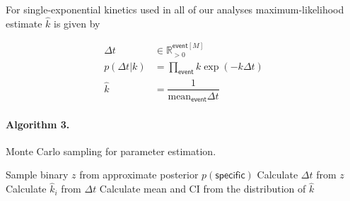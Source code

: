For single-exponential kinetics used in all of our analyses maximum-likelihood estimate $\hat{k}$ is given by

\begin{subequations}
\begin{align}
    \Delta t &\in \mathbb{R}_{>0}^{\mathsf{event}[M]} \\
    p(\Delta t | k) &= \prod_\mathsf{event} k \exp (- k \Delta t) \\
    \hat{k} &= \dfrac{1}{\mathrm{mean}_{\mathsf{event}} \Delta t}
\end{align}
\end{subequations}

\paragraph{Algorithm 3.} Monte Carlo sampling for parameter estimation. \\
\begin{algorithmic}[1]
    \State Sample binary $z$ from approximate posterior $p(\mathsf{specific})$
    \State Calculate $\Delta t$ from $z$
    \State Calculate $\hat{k}_i$ from $\Delta t$
\EndFor{}
\State Calculate mean and CI from the distribution of $\hat{k}$
\end{algorithmic}


